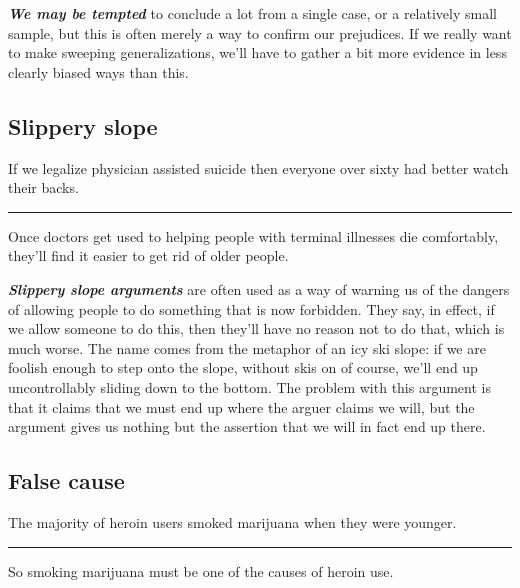 \documentclass[]{book}
\makeatletter
\newenvironment{kframe}{%
\medskip{}
\setlength{\fboxsep}{.8em}
 \def\at@end@of@kframe{}%
 \ifinner\ifhmode%
  \def\at@end@of@kframe{\end{minipage}}%
  \begin{minipage}{\columnwidth}%
 \fi\fi%
 \def\FrameCommand##1{\hskip\@totalleftmargin \hskip-\fboxsep
 \colorbox{shadecolor}{##1}\hskip-\fboxsep
     \hskip-\linewidth \hskip-\@totalleftmargin \hskip\columnwidth}%
 \MakeFramed {\advance\hsize-\width
   \@totalleftmargin\z@ \linewidth\hsize
   \@setminipage}}%
 {\par\unskip\endMakeFramed%
 \at@end@of@kframe}
\newenvironment{rmdblock}[1]
  {
  \begin{itemize}
  \renewcommand{\labelitemi}{
    \raisebox{-.7\height}[0pt][0pt]{
      {\setkeys{Gin}{width=3em,keepaspectratio}\texttt{[image: img/\#1]}}
    }
  }
  \setlength{\fboxsep}{1em}
  \begin{kframe}
  \item
  }
  {
  \end{kframe}
  \end{itemize}
  }
\newenvironment{rmdwarning}
  {\begin{rmdblock}{warning}}
  {\end{rmdblock}}
\makeatother
\begin{document}
\textbf{\emph{We may be tempted}} to conclude a lot from a single case, or a relatively small sample, but this is often merely a way to confirm our prejudices. If we really want to make sweeping generalizations, we'll have to gather a bit more evidence in less clearly biased ways than this.

\hypertarget{slippery-slope}{%
\subsection*{Slippery slope}\label{slippery-slope}}


\begin{rmdwarning}
If we legalize physician assisted suicide then everyone over sixty had
better watch their backs.

\begin{center}\rule{0.5\linewidth}{\linethickness}\end{center}

Once doctors get used to helping people with terminal illnesses die
comfortably, they'll find it easier to get rid of older people.
\end{rmdwarning}

\textbf{\emph{Slippery slope arguments}} are often used as a way of warning us of the dangers of allowing people to do something that is now forbidden. They say, in effect, if we allow someone to do this, then they'll have no reason not to do that, which is much worse. The name comes from the metaphor of an icy ski slope: if we are foolish enough to step onto the slope, without skis on of course, we'll end up uncontrollably sliding down to the bottom. The problem with this argument is that it claims that we must end up where the arguer claims we will, but the argument gives us nothing but the assertion that we will in fact end up there.

\hypertarget{false-cause}{%
\subsection*{False cause}\label{false-cause}}


\begin{rmdwarning}
The majority of heroin users smoked marijuana when they were younger.

\begin{center}\rule{0.5\linewidth}{\linethickness}\end{center}

So smoking marijuana must be one of the causes of heroin use.
\end{rmdwarning}
\end{document}
